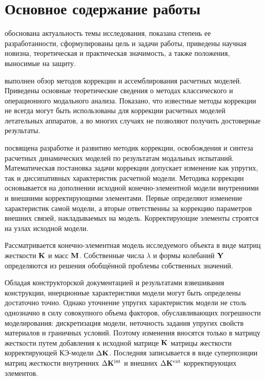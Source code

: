 
\section*{Основное содержание работы}


 обоснована актуальность темы исследования, показана степень ее разработанности, сформулированы цель и задачи работы, приведены научная новизна, теоретическая и практическая значимость, а также положения, выносимые на защиту.


 выполнен обзор методов коррекции и ассемблирования расчетных моделей. Приведены основные теоретические сведения о методах классического и операционного модального анализа. Показано, что известные методы коррекции не всегда могут быть использованы для коррекции расчетных моделей летательных аппаратов, а во многих случаях не позволяют получить достоверные результаты.


 посвящена разработке и развитию методик коррекции, освобождения и синтеза расчетных динамических моделей по результатам модальных испытаний. Математическая постановка задачи коррекции допускает изменение как упругих, так и диссипативных характеристик расчетной модели. Методика коррекции основывается на дополнении исходной конечно-элементной модели внутренними и внешними корректирующими элементами. Первые определяют изменение характеристик самой модели, а вторые ответственны за коррекцию параметров внешних связей, накладываемых на модель. Корректирующие элементы строятся на узлах исходной модели. 

Рассматривается конечно-элементная модель исследуемого объекта в виде матриц жесткости $ \mathbf{K} $ и масс $ \mathbf{M} $. Собственные числа $ \lambda $ и формы колебаний $ \mathbf{Y} $ определяются из решения обобщённой проблемы собственных значений.

Обладая конструкторской документацией и результатами взвешивания конструкции, инерционные характеристики модели могут быть определены достаточно точно. Однако уточнение упругих характеристик модели не столь однозначно в силу совокупного объема факторов, обуславливающих погрешности моделирования: дискретизация модели, неточность задания упругих свойств материалов и граничных условий. Поэтому изменения вносятся только в матрицу жесткости путем добавления к исходной матрице $ \mathbf{K} $ матрицы жесткости корректирующей КЭ-модели $ \Delta \mathbf{K} $. Последняя записывается в виде суперпозиции матриц жесткости внутренних $ \Delta \mathbf{K} ^ {\text{int}} $ и внешних $ \Delta \mathbf{K} ^ {\text{ext}} $ корректирующих элементов.

